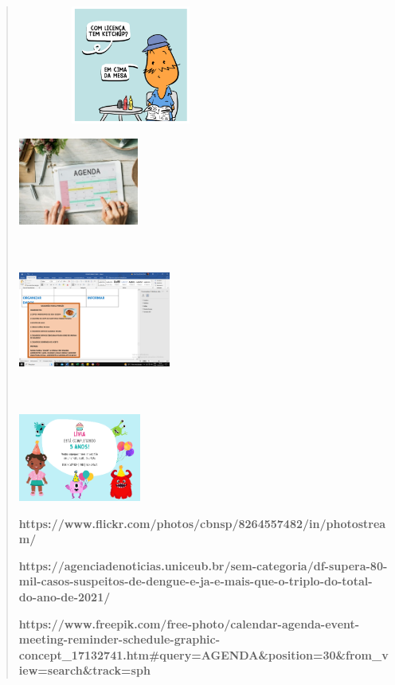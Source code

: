 {{{{\begin{verse}
{{\includegraphics[width=2.91667in,height=1.53611in]{media/image87.png}

\includegraphics[width=1.55208in,height=1.12778in]{media/image90.jpeg}

\includegraphics[width=1.97452in,height=2.09063in]{media/image91.png}

\includegraphics[width=1.58681in,height=1.13333in]{media/image92.png}

\textbf{https://www.flickr.com/photos/cbnsp/8264557482/in/photostream/}

\textbf{https://agenciadenoticias.uniceub.br/sem-categoria/df-supera-80-mil-casos-suspeitos-de-dengue-e-ja-e-mais-que-o-triplo-do-total-do-ano-de-2021/}

\textbf{https://www.freepik.com/free-photo/calendar-agenda-event-meeting-reminder-schedule-graphic-concept\_17132741.htm\#query=AGENDA\&position=30\&from\_view=search\&track=sph}


}}
\end{verse}}}}}
